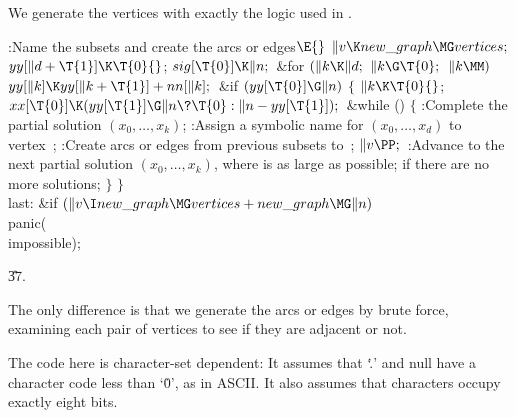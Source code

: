 We generate the vertices with exactly the logic used in .

\Y\B\4:Name the subsets and create the arcs or edges\X${}\E{}$\6
$\|v\K\\{new\_graph}\MG\\{vertices};{}$\6
${}\\{yy}[\|d+\T{1}]\K\T{0}{}$;\5
${}\\{sig}[\T{0}]\K\|n;{}$\6
\&{for} ${}(\|k\K\|d;{}$ ${}\|k\G\T{0};{}$ ${}\|k\MM){}$\1\5
${}\\{yy}[\|k]\K\\{yy}[\|k+\T{1}]+\\{nn}[\|k];{}$\2\6
\&{if} ${}(\\{yy}[\T{0}]\G\|n){}$\5
${}\{{}$\1\6
${}\|k\K\T{0}{}$;\5
${}\\{xx}[\T{0}]\K(\\{yy}[\T{1}]\G\|n\?\T{0}:\|n-\\{yy}[\T{1}]);{}$\6
\&{while} ()\5
${}\{{}$\1\6
:Complete the partial solution $(x_0,\ldots,x_k)$\X;\6
:Assign a symbolic name for $(x_0,\ldots,x_d)$ to vertex~\X;\6
:Create arcs or edges from previous subsets to~\X;\6
${}\|v\PP;{}$\6
:Advance to the next partial solution $(x_0,\ldots,x_k)$, where  is
as large as possible;  if there are no more solutions\X;\6
\4${}\}{}$\2\6
\4${}\}{}$\2\6
\4\\{last}:\5
\&{if} ${}(\|v\I\\{new\_graph}\MG\\{vertices}+\\{new\_graph}\MG\|n){}$\1\5
\\{panic}(\\{impossible});\2\par
\U37.\fi

The only difference is that we generate the arcs or edges by brute
force, examining each pair of vertices to see if they are adjacent or not.

The code here is character-set dependent: It assumes that `\..' and null
have a character code less than `\.0', as in ASCII. It also assumes
that characters occupy exactly eight bits.

